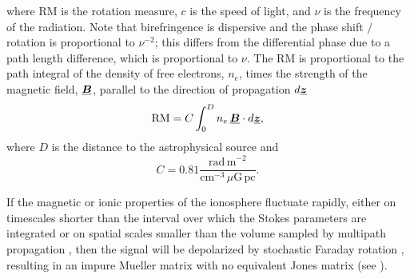 where RM is the rotation measure, $c$ is the speed of light, and $\nu$ is the frequency of the radiation.
%
Note that birefringence is dispersive and the phase shift / rotation is proportional to $\nu^{-2}$; this differs from the differential phase
due to a path length difference, which is proportional to $\nu$.
%
The RM is proportional to the path integral of the density of free electrons, $n_e$, times the strength of the magnetic field, $\underline{\mbox{\boldmath $B$}}$, parallel to the direction of propagation $d\underline{\mbox{\boldmath $z$}}$ \citep[e.g.,][]{hml+06}
%
\begin{equation}
\mathrm{RM} = C \int_0^D n_e \, \underline{\mbox{\boldmath $B$}} \cdot  d\underline{\mbox{\boldmath $z$}},
\end{equation}
%
where $D$ is the distance to the astrophysical source and
%
\begin{equation}
C = 0.81 \frac{\mathrm{rad\, m}^{-2}}{ \mathrm{cm}^{-3} \, \mu\mathrm{G \, pc} }.
\end{equation}


If the magnetic or ionic properties of the ionosphere fluctuate rapidly, either on timescales
shorter than the interval over which the Stokes parameters are integrated or on spatial scales smaller than
the volume sampled by multipath propagation \cite[e.g.,][]{css16,sc19}, then the signal
will be depolarized by stochastic Faraday rotation \citep{mm98}, resulting in an impure
Mueller matrix with no equivalent Jones matrix (see ).

